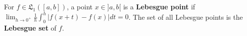 For $f \in \mathfrak{L}_1([a, b])$, a point $x \in ]a, b[$ is a \textbf{Lebesgue point} if $\lim_{h \to 0^+} \frac{1}{h} \int_0^h |f(x+t) - f(x)| dt = 0$. The set of all Lebesgue points is the \textbf{Lebesgue set} of $f$.
